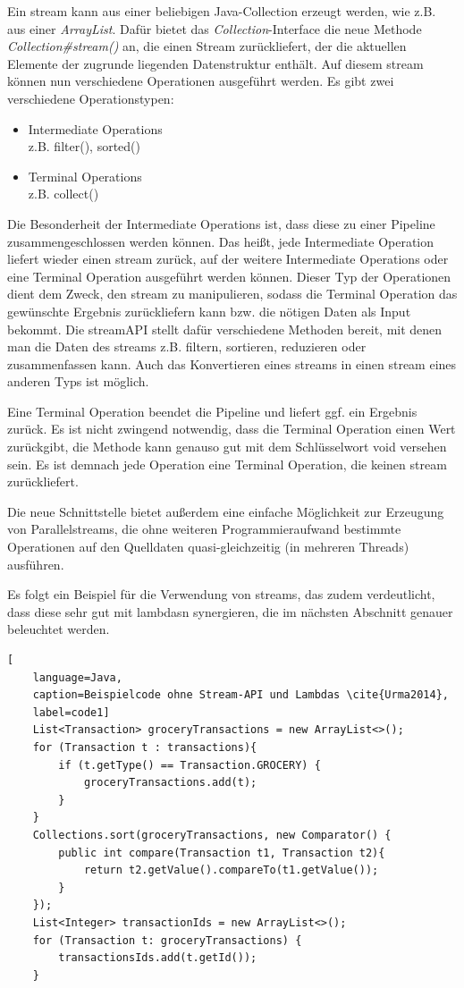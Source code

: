Ein \gls{stream} kann aus einer beliebigen Java-Collection erzeugt werden, wie z.B. aus einer \textit{ArrayList}. Dafür bietet das \textit{Collection}-Interface die neue Methode \textit{Collection\#stream()} an, die einen Stream zurückliefert, der die aktuellen Elemente der zugrunde liegenden Datenstruktur enthält. Auf diesem \gls{stream} können nun verschiedene Operationen ausgeführt werden. \cite{Urma2014} Es gibt zwei verschiedene Operationstypen:
\begin{itemize}
	\item Intermediate Operations \\z.B. filter(), sorted()
	\item Terminal Operations \\ z.B. collect()
\end{itemize}

Die Besonderheit der Intermediate Operations ist, dass diese zu einer Pipeline zusammengeschlossen werden können. Das heißt, jede Intermediate Operation liefert wieder einen \gls{stream} zurück, auf der weitere Intermediate Operations oder eine Terminal Operation ausgeführt werden können. Dieser Typ der Operationen dient dem Zweck, den \gls{stream} zu manipulieren, sodass die Terminal Operation das gewünschte Ergebnis zurückliefern kann bzw. die nötigen Daten als Input bekommt. Die \gls{streamAPI} stellt dafür verschiedene Methoden bereit, mit denen man die Daten des \gls{stream}s z.B. filtern, sortieren, reduzieren oder zusammenfassen kann. Auch das Konvertieren eines \gls{stream}s in einen \gls{stream} eines anderen Typs ist möglich. \cite{Urma2014}

Eine Terminal Operation beendet die Pipeline und liefert ggf. ein Ergebnis zurück. Es ist nicht zwingend notwendig, dass die Terminal Operation einen Wert zurückgibt, die Methode kann genauso gut mit dem Schlüsselwort void versehen sein. Es ist demnach jede Operation eine Terminal Operation, die keinen \gls{stream} zurückliefert. \cite{Urma2014}

Die neue Schnittstelle bietet außerdem eine einfache Möglichkeit zur Erzeugung von Parallel\gls{stream}s, die ohne weiteren Programmieraufwand bestimmte Operationen auf den Quelldaten quasi-gleichzeitig (in mehreren Threads) ausführen. \cite{Urma2014}

Es folgt ein Beispiel für die Verwendung von \gls{stream}s, das zudem verdeutlicht, dass diese sehr gut mit \glspl{lambda}n synergieren, die im nächsten Abschnitt genauer beleuchtet werden.

\begin{lstlisting}[
    language=Java,
    caption=Beispielcode ohne Stream-API und Lambdas \cite{Urma2014},
    label=code1]
	List<Transaction> groceryTransactions = new ArrayList<>();
	for (Transaction t : transactions){
		if (t.getType() == Transaction.GROCERY) {
			groceryTransactions.add(t);
  		}
	}
	Collections.sort(groceryTransactions, new Comparator() {
 		public int compare(Transaction t1, Transaction t2){
			return t2.getValue().compareTo(t1.getValue());
		}
	});
	List<Integer> transactionIds = new ArrayList<>();
	for (Transaction t: groceryTransactions) {
		transactionsIds.add(t.getId());
	}
\end{lstlisting}  

